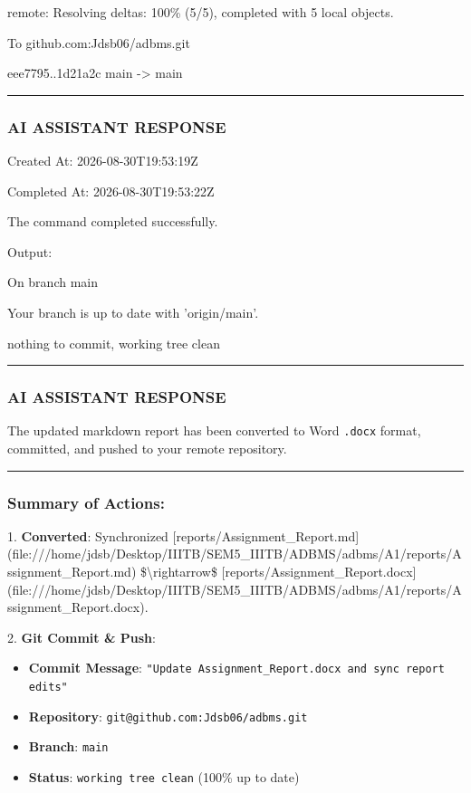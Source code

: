 \documentclass[11pt,a4paper]{article}
\begin{document}
{remote: Resolving deltas: 100\% (5/5), completed with 5 local objects.

To github.com:Jdsb06/adbms.git

eee7795..1d21a2c  main -> main


\hrule

\subsubsection{AI ASSISTANT RESPONSE}

Created At: 2026-08-30T19:53:19Z

Completed At: 2026-08-30T19:53:22Z


The command completed successfully.

Output:

On branch main

Your branch is up to date with 'origin/main'.


nothing to commit, working tree clean


\hrule

\subsubsection{AI ASSISTANT RESPONSE}

The updated markdown report has been converted to Word \texttt{.docx} format, committed, and pushed to your remote repository.


\hrule


\subsubsection{Summary of Actions:}
1. \textbf{Converted}: Synchronized [reports/Assignment\_Report.md](file:///home/jdsb/Desktop/IIITB/SEM5\_IIITB/ADBMS/adbms/A1/reports/Assignment\_Report.md) \$\textbackslash{}rightarrow\$ [reports/Assignment\_Report.docx](file:///home/jdsb/Desktop/IIITB/SEM5\_IIITB/ADBMS/adbms/A1/reports/Assignment\_Report.docx).

2. \textbf{Git Commit \& Push}:

\begin{itemize}
\item \textbf{Commit Message}: \texttt{"Update Assignment\_Report.docx and sync report edits"}
\item \textbf{Repository}: \texttt{git@github.com:Jdsb06/adbms.git}
\item \textbf{Branch}: \texttt{main}
\item \textbf{Status}: \texttt{working tree clean} (100\% up to date)
\end{itemize}

}
\end{document}
